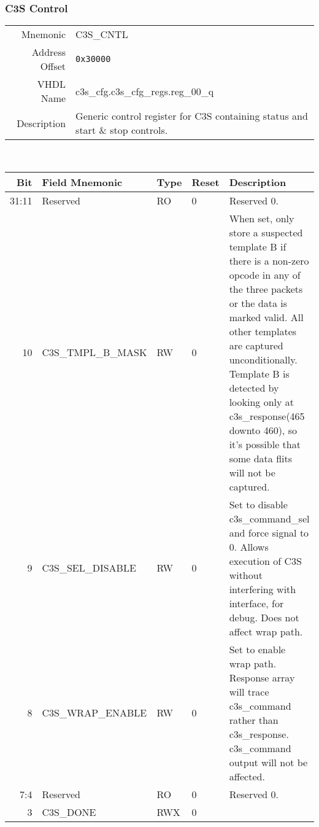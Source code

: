 \subsubsection{C3S Control}
\begin{tabular}{ r | p{350px} }
  Mnemonic       & C3S\_CNTL                          \\
  Address Offset & \texttt{0x30000}                   \\
  VHDL Name      & c3s\_cfg.c3s\_cfg\_regs.reg\_00\_q \\ \hline

  Description &
  Generic control register for C3S containing status and start \& stop controls.
\end{tabular}
\\
\begin{tabularx}{\textwidth}{r|l|l|l|X}
  \hline
  Bit   & Field Mnemonic      & Type & Reset & Description \\ \hline

  31:11 & Reserved            & RO   & 0     &

  Reserved 0. \\

  10    & C3S\_TMPL\_B\_MASK  & RW   & 0     &

  When set, only store a suspected template B if there is a non-zero
  opcode in any of the three packets or the data is marked valid. All
  other templates are captured unconditionally. Template B is detected
  by looking only at c3s\_response(465 downto 460), so it's possible
  that some data flits will not be captured. \\

  9     & C3S\_SEL\_DISABLE   & RW   & 0     &

  Set to disable c3s\_command\_sel and force signal to 0. Allows
  execution of C3S without interfering with interface, for debug. Does
  not affect wrap path. \\

  8     & C3S\_WRAP\_ENABLE   & RW   & 0     &

  Set to enable wrap path. Response array will trace c3s\_command
  rather than c3s\_response. c3s\_command output will not be
  affected. \\

  7:4   & Reserved            & RO   & 0     &

  Reserved 0. \\

  3     & C3S\_DONE           & RWX  & 0     &


\end{tabularx}
